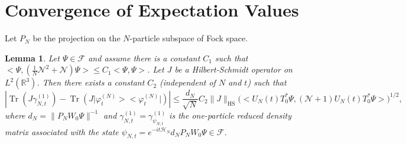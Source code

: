 \documentclass[11pt,a4paper,draft,DIV11]{scrartcl}	%
\newtheorem{lem}[thm]{Lemma}
\newcommand{\fock}{\mathcal{F}}		%
\newcommand{\Ncal}{\mathcal{N}}		%
\newcommand{\Hcal}{\mathcal{H}}		%
\newcommand{\scal}[2]{\big<#1,#2\big>} %
\newcommand{\Rbb}{\mathbb{R}}		%
\newcommand{\norm}[1]{\lVert#1\rVert}	%
\newcommand{\ph}{\varphi_t^{(N)}}	%
\newcommand{\project}[1]{\lvert #1 \big>\big< #1\rvert}	%
\newcommand{\Tr}{\operatorname{Tr}}	%
\newcommand{\HS}{_{\textrm{HS}}}
\newcommand{\bd}{\begin{displaymath}}			%
\newcommand{\ed}{\end{displaymath}}
\begin{document}
\section{Convergence of Expectation Values}
\label{s:expectation}
Let $P_N$ be the projection on the $N$-particle subspace of Fock space.
\begin{lem}
\label{lem:TrJ}
Let $\Psi \in \fock$ and assume there is a constant $C_1$ such that $\scal{\Psi}{\left(\frac{1}{N}\Ncal^2 + \Ncal\right)\Psi} \leq C_1 \scal{\Psi}{\Psi}$. Let $J$ be a Hilbert-Schmidt operator on $L^2(\Rbb^3)$. Then there exists a constant $C_2$ (independent of $N$ and $t$) such that
\bd
\left\lvert \Tr\left(J \gamma_{N,t}^{(1)} \right) - \Tr\left( J \project{\ph}  \right) \right\rvert \leq \frac{d_N}{\sqrt{N}}C_2 \norm{J}\HS \Big( \scal{U_N(t) T^\ast_0 \Psi}{\left( \Ncal+1 \right)U_N(t) T^\ast_0 \Psi} \Big)^{1/2},
\ed
where $d_N = \norm{P_N W_0\Psi}^{-1}$ and $\gamma_{N,t}^{(1)} = \gamma_{\psi_{N,t}}^{(1)}$ is the one-particle reduced density matrix associated with the state $\psi_{N,t} = e^{-it \Hcal_N} d_N P_N W_0 \Psi \in \fock$.
%
\end{lem}
\end{document}
